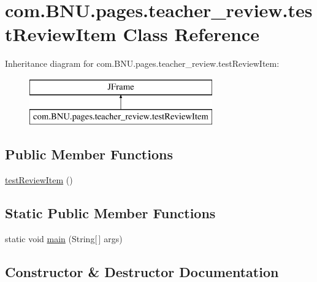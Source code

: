 \hypertarget{classcom_1_1_b_n_u_1_1pages_1_1teacher__review_1_1test_review_item}{}\section{com.\+B\+N\+U.\+pages.\+teacher\+\_\+review.\+test\+Review\+Item Class Reference}
\label{classcom_1_1_b_n_u_1_1pages_1_1teacher__review_1_1test_review_item}
Inheritance diagram for com.\+B\+N\+U.\+pages.\+teacher\+\_\+review.\+test\+Review\+Item\+:\begin{figure}[H]
\begin{center}
\leavevmode
\includegraphics[height=2.000000cm]{classcom_1_1_b_n_u_1_1pages_1_1teacher__review_1_1test_review_item}
\end{center}
\end{figure}
\subsection*{Public Member Functions}
\begin{DoxyCompactItemize}
\item 
\mbox{\hyperlink{classcom_1_1_b_n_u_1_1pages_1_1teacher__review_1_1test_review_item_aa845b19dc5771f4433269a553130bbcc}{test\+Review\+Item}} ()
\end{DoxyCompactItemize}
\subsection*{Static Public Member Functions}
\begin{DoxyCompactItemize}
\item 
static void \mbox{\hyperlink{classcom_1_1_b_n_u_1_1pages_1_1teacher__review_1_1test_review_item_a85d41fa69ecef69861f14f199b070d0f}{main}} (String\mbox{[}$\,$\mbox{]} args)
\end{DoxyCompactItemize}


\subsection{Constructor \& Destructor Documentation}
\mbox{\label{classcom_1_1_b_n_u_1_1pages_1_1teacher__review_1_1test_review_item_aa845b19dc5771f4433269a553130bbcc}} 
